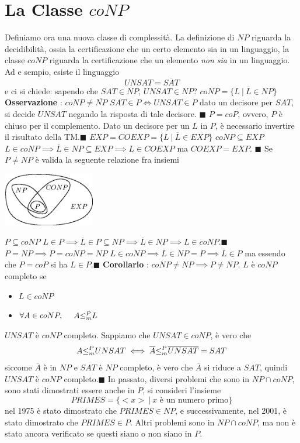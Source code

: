 \documentclass[10pt, letterpaper]{report}
\begin{document}
\section{La Classe $coNP$}
Definiamo ora una nuova classe di complessità. La definizione di $NP$ riguarda la decidibilità, ossia la certificazione che un certo elemento sia in un linguaggio, la classe $coNP$ riguarda la certificazione che un elemento \textit{non sia} in un linguaggio.\acc 
Ad e sempio, esiste il linguaggio $$ UNSAT=\overline{SAT}$$
e ci si chiede: sapendo che $SAT\in NP$, $UNSAT\in NP$?\acc 
{} $coNP=\{L \ | \ \overline{L}\in NP\}$\acc 
\textbf{Osservazione} : $coNP \ne \overline{NP}$\acc 
\teo{} $SAT\in P \iff UNSAT \in P$\acc 
\dimo{} dato un decisore per $SAT$, si decide $UNSAT$ negando la risposta di tale decisore.
\hfill$\blacksquare$\acc  
\teo{} $P=coP$, ovvero, $P$ è chiuso per il complemento.\acc 
\dimo{} Dato un decisore per un $L$ in $P$, è necessario invertire il risultato della TM.\hfill$\blacksquare$\acc  
\prop{} $EXP=COEXP=\{L \ | \ \overline L \in EXP\}$ \acc 
\teo{} $coNP\subseteq EXP$\acc 
\dimo{} $L\in coNP \implies \overline L \in NP \subseteq EXP \implies L\in COEXP$ ma $COEXP=EXP$.
\hfill$\blacksquare$\acc  
Se $P\ne NP$ è valida la seguente relazione fra insiemi 
\begin{center}
    \includegraphics[width=0.3\textwidth ]{images/coNP.eps}
\end{center}
\teo{} $P\subseteq coNP$\acc 
\dimo{} $L\in P\implies \overline L \in P \subseteq NP \implies 
\overline L \in NP \implies L\in coNP$.\hfill$\blacksquare$\acc  
\teo{} $P=NP\implies P=coNP=NP$\acc 
\dimo{} $L\in coNP\implies \overline L \in NP=P \implies \overline L \in P $ ma essendo che $P=coP$ si ha $L \in P$.\hfill$\blacksquare$\acc   
\textbf{Corollario} : $coNP\ne NP\implies P \ne NP$.\acc
{} $L$ è $coNP$ completo se\begin{itemize}
    \item $L\in coNP$
    \item $\forall A \in coNP, \ \ \ \ A{\le_m^P} L$
\end{itemize} 
\teo{} $UNSAT$ è $coNP$ completo.\acc 
\dimo{} Sappiamo che $UNSAT\in coNP$, è vero che 
$$ A{\le_m^P} UNSAT \iff \overline A {\le_m^P} \overline{UNSAT}=SAT$$
siccome $\overline A$ è in $NP$ e $SAT$ è $NP$ completo, è vero che $\overline A$ si riduce a $SAT$, quindi $UNSAT$ è $coNP$ completo.\hfill$\blacksquare$\acc  
In passato, diversi problemi che sono in $NP\cap coNP$, sono stati dimostrati essere anche in $P$, si consideri l'insieme 
$$ PRIMES=\{<x> \ | \ x\text{ è un numero primo}\}$$
nel 1975 è stato dimostrato che $PRIMES\in NP$, e successivamente, nel 2001, è stato dimostrato che $PRIMES\in P$. Altri problemi sono in $NP\cap coNP$, ma non è stato ancora verificato se questi siano o non siano in $P$.
\end{document}
